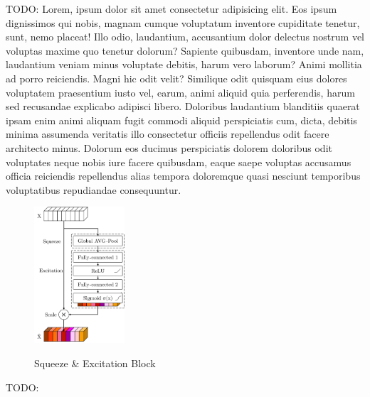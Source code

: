 TODO: Lorem, ipsum dolor sit amet consectetur adipisicing elit. Eos ipsum dignissimos qui nobis, magnam cumque voluptatum inventore cupiditate tenetur, sunt, nemo placeat! Illo odio, laudantium, accusantium dolor delectus nostrum vel voluptas maxime quo tenetur dolorum? Sapiente quibusdam, inventore unde nam, laudantium veniam minus voluptate debitis, harum vero laborum? Animi mollitia ad porro reiciendis. Magni hic odit velit? Similique odit quisquam eius dolores voluptatem praesentium iusto vel, earum, animi aliquid quia perferendis, harum sed recusandae explicabo adipisci libero. Doloribus laudantium blanditiis quaerat ipsam enim animi aliquam fugit commodi aliquid perspiciatis cum, dicta, debitis minima assumenda veritatis illo consectetur officiis repellendus odit facere architecto minus. Dolorum eos ducimus perspiciatis dolorem doloribus odit voluptates neque nobis iure facere quibusdam, eaque saepe voluptas accusamus officia reiciendis repellendus alias tempora doloremque quasi nesciunt temporibus voluptatibus repudiandae consequuntur.

\begin{figure}
    \centering
    \includegraphics[width=0.3\textwidth]{res/pictures/squeeze-and-excitation-block.pdf}
    \caption[Squeeze \& Excitation Block]{\unskip}
    Squeeze \& Excitation Block
    \label{fig:squeeze-and-excitation-block}
\end{figure}

TODO: